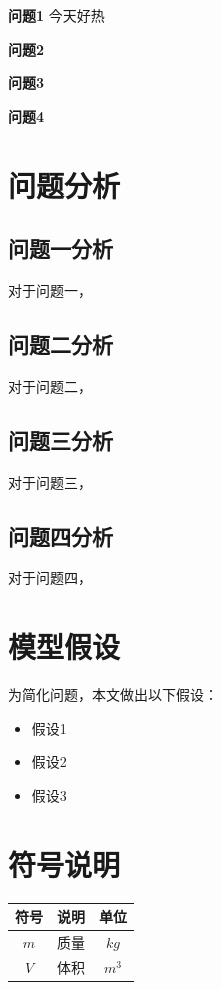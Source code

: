 \documentclass[withoutpreface]{njtechmcmthesis}
\begin{document}
\textbf{问题1}  今天好热

\textbf{问题2}  

\textbf{问题3} 

\textbf{问题4}  


\section{问题分析}
\subsection{问题一分析}
对于问题一，

\subsection{问题二分析}	
对于问题二，

\subsection{问题三分析}
对于问题三，

\subsection{问题四分析}
对于问题四，


\section{模型假设}

为简化问题，本文做出以下假设：

\begin{itemize}[itemindent=2em]
\item 假设1
\item 假设2
\item 假设3
\end{itemize}


\section{符号说明}
\begin{table}[H]
\centering
\begin{tabularx}{\textwidth}{CLC}
\toprule
符号    & 说明    & 单位 \\
\midrule
$m     $& 质量 & $kg$ \\
$V     $& 体积 & $m^3$ \\
\bottomrule
\end{tabularx}
\label{tab:符号说明}
\end{table}
\end{document}
